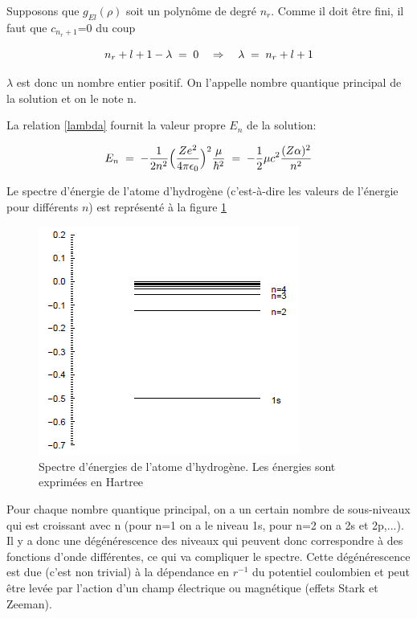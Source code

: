 Supposons que $g_{El}(\rho)$ soit un polynôme de degré $n_r$. Comme il doit être fini, il faut que $c_{n_{r}+1}$=0 du coup

\begin{equation*}
    n_r+l+1-\lambda\; = \;0 \quad \Rightarrow \quad \lambda\; = \; n_r +l+1
\end{equation*}

\vspace{0.2cm}

$\lambda$ est donc un nombre entier positif. On l'appelle nombre quantique principal de la solution et on le note n. 

\vspace{0.2cm}

La relation \eqref{lambda} fournit la valeur propre $E_n$ de la solution:

\begin{equation}
    E_n\; = \; -\dfrac{1}{2n^2}\Big(\dfrac{Ze^2}{4\pi\epsilon_0}\Big)^2\dfrac{\mu}{\hbar^2}\; = \; -\dfrac{1}{2}\mu c^2 \dfrac{(Z\alpha)^2}{n^2}
\end{equation}

Le spectre d'énergie de l'atome d'hydrogène (c'est-à-dire les valeurs de l'énergie pour différents $n$) est représenté à la figure \ref{fig:spectreH}

\begin{figure}[tph]
    \centering
    \includegraphics{Images2/spectreH.PNG}
    \caption{Spectre d'énergies de l'atome d'hydrogène. Les énergies sont exprimées en Hartree}
    \label{fig:spectreH}
\end{figure}

Pour chaque nombre quantique principal, on a un certain nombre de sous-niveaux qui est croissant avec n (pour n=1 on a le niveau 1s, pour n=2 on a 2s et 2p,...). Il y a donc une dégénérescence des niveaux qui peuvent donc correspondre à des fonctions d'onde différentes, ce qui va compliquer le spectre. Cette dégénérescence est due (c'est non trivial) à la dépendance en $r^{-1}$ du potentiel coulombien et peut être levée par l'action d'un champ électrique ou magnétique (effets Stark et Zeeman). \\

